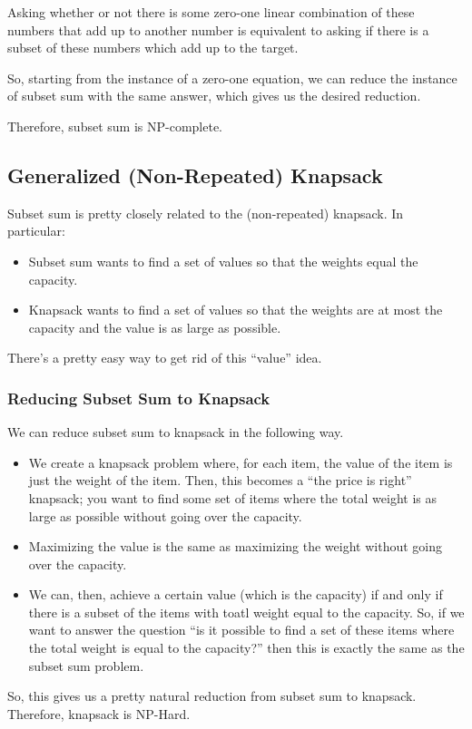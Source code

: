 \documentclass[letterpaper]{article}
\begin{document}
\bigskip 

Asking whether or not there is some zero-one linear combination of these numbers that add up to another number is equivalent to asking if there is a subset of these numbers which add up to the target. 

\bigskip 

So, starting from the instance of a zero-one equation, we can reduce the instance of subset sum with the same answer, which gives us the desired reduction. 

\bigskip 

Therefore, subset sum is NP-complete. 

\subsection{Generalized (Non-Repeated) Knapsack}
Subset sum is pretty closely related to the (non-repeated) knapsack. In particular: 
\begin{itemize}
    \item Subset sum wants to find a set of values so that the weights equal the capacity. 
    \item Knapsack wants to find a set of values so that the weights are at most the capacity and the value is as large as possible. 
\end{itemize}
There's a pretty easy way to get rid of this ``value'' idea. 

\subsubsection{Reducing Subset Sum to Knapsack}
We can reduce subset sum to knapsack in the following way. 
\begin{itemize}
    \item We create a knapsack problem where, for each item, the value of the item is just the weight of the item. Then, this becomes a ``the price is right'' knapsack; you want to find some set of items where the total weight is as large as possible without going over the capacity. 
    \item Maximizing the value is the same as maximizing the weight without going over the capacity. 
    \item We can, then, achieve a certain value (which is the capacity) if and only if there is a subset of the items with toatl weight equal to the capacity. So, if we want to answer the question ``is it possible to find a set of these items where the total weight is equal to the capacity?'' then this is exactly the same as the subset sum problem. 
\end{itemize}
So, this gives us a pretty natural reduction from subset sum to knapsack. Therefore, knapsack is NP-Hard. 
\end{document}
